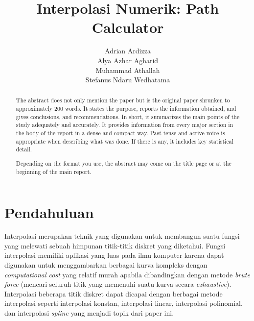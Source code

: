 \documentclass[journal,12pt,onecolumn,a4paper]{IEEEtran}
\begin{document}
\begin{titlepage}
	\title{Interpolasi Numerik: Path Calculator}



	\author{Adrian Ardizza\\
		Alya Azhar Agharid\\
		Muhammad Athallah\\
		Stefanus Ndaru Wedhatama
	}

	\maketitle
	\begin{abstract}
		The abstract does not only mention the paper but is the original paper shrunken to approximately 200 words. It states the purpose, reports the information obtained, and gives conclusions, and recommendations. In short, it summarizes the main points of the study adequately and accurately. It provides information from every major section in the body of the report in a dense and compact way. Past tense and active voice is appropriate when describing what was done. If there is any, it includes key statistical detail.

		Depending on the format you use, the abstract may come on the title page or at the beginning of the main report.

	\end{abstract}
	\tableofcontents
	\listoffigures
	\listoftables
\end{titlepage}

\IEEEpeerreviewmaketitle

\section{Pendahuluan}
Interpolasi merupakan teknik yang digunakan untuk membangun suatu fungsi yang melewati sebuah himpunan titik-titik diskret yang diketahui. Fungsi interpolasi memiliki aplikasi yang luas pada ilmu komputer karena dapat digunakan untuk menggambarkan berbagai kurva kompleks dengan \emph{computational cost} yang relatif murah apabila dibandingkan dengan metode \emph{brute force} (mencari seluruh titik yang memenuhi suatu kurva secara \emph{exhaustive}). Interpolasi beberapa titik diskret dapat dicapai dengan berbagai metode interpolasi seperti interpolasi konstan, interpolasi linear, interpolasi polinomial, dan interpolasi \emph{spline} yang menjadi topik dari paper ini.
\end{document}
